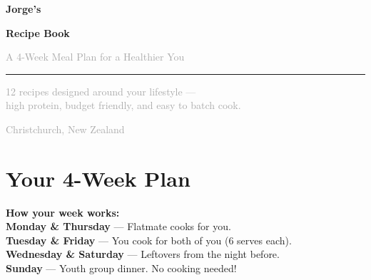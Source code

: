 \documentclass[12pt, a4paper]{book}
\begin{document}
\begin{titlepage}
  \centering
  \vspace*{3cm}
  {\fontsize{48}{56}\selectfont\bfseries\textcolor{primary}{Jorge's}\par}
  \vspace{0.3cm}
  {\fontsize{32}{40}\selectfont\bfseries\textcolor{accent}{Recipe Book}\par}
  \vspace{0.5cm}
  {\large\textcolor{darkgray}{A 4-Week Meal Plan for a Healthier You}\par}
  \vspace{1.5cm}
  \textcolor{primary}{\rule{0.6\linewidth}{2pt}}
  \vspace{1.5cm}

  {\large\textcolor{darkgray}{
    12 recipes designed around your lifestyle ---\\[6pt]
    high protein, budget friendly, and easy to batch cook.
  }\par}

  \vfill
  {\small\textcolor{darkgray}{Christchurch, New Zealand \\ \the\year}}
\end{titlepage}

\tableofcontents
\clearpage

\chapter*{Your 4-Week Plan}

\begin{tipbox}
  \textbf{How your week works:}\\
  \textbf{Monday \& Thursday} --- Flatmate cooks for you.\\
  \textbf{Tuesday \& Friday} --- You cook for both of you (6 serves each).\\
  \textbf{Wednesday \& Saturday} --- Leftovers from the night before.\\
  \textbf{Sunday} --- Youth group dinner. No cooking needed!
\end{tipbox}

\vspace{0.5cm}
\end{document}
